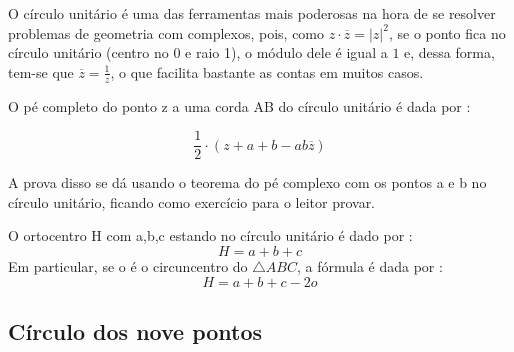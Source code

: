 \documentclass{article}
\begin{document}
O círculo unitário é uma das ferramentas mais poderosas na hora de se resolver problemas de geometria com complexos, pois, como $z \cdot \overline{z} = |z|^2$, se o ponto fica no círculo  unitário (centro no 0 e raio 1), o módulo dele é igual a $1$ e, dessa forma, tem-se que $\overline{z} = \frac{1}{z}$, o que facilita bastante as contas em muitos casos.
\begin{center}
\end{center}
\begin{tcolorbox}[colback=blue!5!white,colframe=blue!75!black,title=Pé complexo(Círculo Unitário)\emoji{nerd-face}]
O pé completo do ponto z a uma corda AB do círculo unitário é dada por : 

$$\frac{1}{2} \cdot (z + a + b - ab \overline{z})$$

\end{tcolorbox}

A prova disso se dá usando o teorema do pé complexo com os pontos a e b no círculo unitário, ficando como exercício para o leitor provar.

\begin{tcolorbox}[colback=blue!5!white,colframe=blue!75!black,title=Ortocentro\emoji{nerd-face}]
    O ortocentro H com a,b,c estando no círculo unitário é dado por : 
    $$ H = a + b + c$$
    Em particular, se o é o circuncentro do $\triangle ABC$, a fórmula é dada por : 
    $$ H = a + b + c - 2o$$
\end{tcolorbox}

\subsection{Círculo dos nove pontos}
\end{document}
